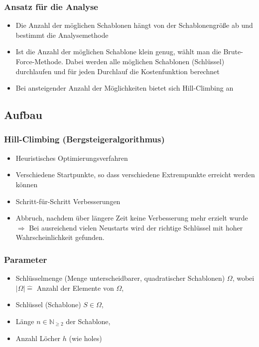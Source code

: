 \documentclass{beamer}
\begin{document}
\begin{frame}\frametitle{Ansatz für die Analyse}
\begin{itemize}
\item Die Anzahl der möglichen Schablonen hängt von der Schablonengröße ab und bestimmt die Analysemethode%
\item Ist die Anzahl der möglichen Schablone \glqq klein genug\grqq{}, wählt man die \glqq Brute-Force\grqq-Methode. Dabei werden alle möglichen Schablonen (Schlüssel) durchlaufen und für jeden Durchlauf die Kostenfunktion berechnet%
\item Bei ansteigender Anzahl der Möglichkeiten bietet sich \glqq Hill-Climbing\grqq{} an
\end{itemize}
\end{frame}

\subsection{Aufbau}
\begin{frame}\frametitle{Hill-Climbing (Bergsteigeralgorithmus)}
\begin{itemize}
\item Heuristisches Optimierungsverfahren %
\item Verschiedene Startpunkte, so dass verschiedene Extrempunkte erreicht werden können%
\item Schritt-für-Schritt Verbesserungen%
\item Abbruch, nachdem über längere Zeit keine Verbesserung mehr erzielt wurde\\
$\Rightarrow$ Bei \glqq ausreichend\grqq{} vielen Neustarts wird der richtige Schlüssel mit hoher Wahrscheinlichkeit gefunden.
\end{itemize}
\end{frame}

\begin{frame}\frametitle{Parameter}
\begin{itemize}
\item Schlüsselmenge (Menge unterscheidbarer, quadratischer Schablonen) $\Omega$, wobei $|\Omega|\hat{=}$ Anzahl der Elemente von $\Omega$,%
\item Schlüssel (Schablone) $S\in\Omega$,%
\item Länge $n \in \mathbb{N}_{\geqslant 2}$ der Schablone,%
\item Anzahl Löcher $h$ (wie \glqq holes\grqq)
\end{itemize}
\end{frame}
\end{document}

